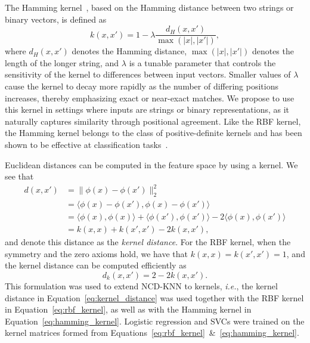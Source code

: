 \documentclass[preprint,12pt]{article}
\begin{document}
The Hamming kernel~\cite{hamming_kernel}, based on the Hamming distance between two strings or binary vectors, is defined as  
\begin{equation}
    k(x, x') = 1 - \lambda \frac{d_H(x,x')}{\max(|x|,|x'|)},
    \label{eq:hamming_kernel}
\end{equation}  
where $ d_H(x, x') $ denotes the Hamming distance, $\max(|x|,|x'|)$ denotes the length of the longer string, and $ \lambda $ is a tunable parameter that controls the sensitivity of the kernel to differences between input vectors.
Smaller values of $ \lambda $ cause the kernel to decay more rapidly as the number of differing positions increases, thereby emphasizing exact or near-exact matches.
We propose to use this kernel in settings where inputs are strings or binary representations, as it naturally captures similarity through positional agreement.
Like the RBF kernel, the Hamming kernel belongs to the class of positive-definite kernels and has been shown to be effective at classification tasks~\cite{hamming_classification}.


Euclidean distances can be computed in the feature space by using a kernel. We see that
\begin{align*}
    d(x,x')
        &= \| \phi(x) - \phi(x') \|_2^2 \\ 
        &= \langle\phi(x) - \phi(x'), \phi(x) - \phi(x') \rangle \\
        &= \langle \phi(x), \phi(x) \rangle + \langle \phi(x'), \phi(x') \rangle - 2\langle \phi(x), \phi(x') \rangle \\
        &= k(x, x) + k(x', x') - 2k(x, x'),
\end{align*}
and denote this distance as the \textit{kernel distance}.
For the RBF kernel, when the symmetry and the zero axioms hold, we have that $k(x,x) = k(x',x') = 1$, and the kernel distance can be computed efficiently as
\begin{equation}
    d_k(x, x') = 2 - 2 k(x, x').
    \label{eq:kernel_distance}
\end{equation}
This formulation was used to extend NCD-KNN to kernels, \textit{i.e.}, the kernel distance in Equation~\ref{eq:kernel_distance} was used together with the RBF kernel in Equation~\ref{eq:rbf_kernel}, as well as with the Hamming kernel in Equation~\ref{eq:hamming_kernel}. 
Logistic regression and SVCs were trained on the kernel matrices formed from Equations~\ref{eq:rbf_kernel}~\&~\ref{eq:hamming_kernel}. 
\end{document}
